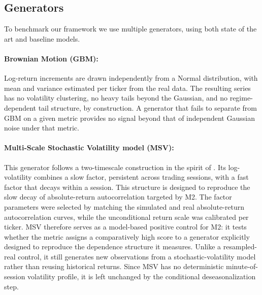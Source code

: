 \subsection{Generators}\label{sec:generators}

To benchmark our framework we use multiple generators, using both state
of the art and baseline models.

\paragraph{Brownian Motion (GBM):}
Log-return increments are drawn independently from a Normal
distribution, with mean and variance estimated per ticker from the
real data.
The resulting series has no volatility clustering, no heavy tails
beyond the Gaussian, and no regime-dependent tail structure, by
construction.
A generator that fails to separate from GBM on a given metric provides
no signal beyond that of independent Gaussian noise under that metric.

\paragraph{Multi-Scale Stochastic Volatility model (MSV):}
This generator follows a two-timescale construction in the spirit of
\citet{fouque2000derivatives}.
Its log-volatility combines a slow factor, persistent across trading sessions, with a fast factor that decays within a session.
This structure is designed to reproduce the slow decay of absolute-return autocorrelation targeted by M2.
The factor parameters were selected by matching
the simulated and real absolute-return autocorrelation curves, while the
unconditional return scale was calibrated per ticker.
MSV therefore serves
as a model-based positive control for M2: it tests whether the metric assigns
a comparatively high score to a generator explicitly designed to reproduce
the dependence structure it measures.
Unlike a resampled-real control, it
still generates new observations from a stochastic-volatility model rather
than reusing historical returns.
Since MSV has no deterministic
minute-of-session volatility profile, it is left unchanged by the conditional
deseasonalization step.


